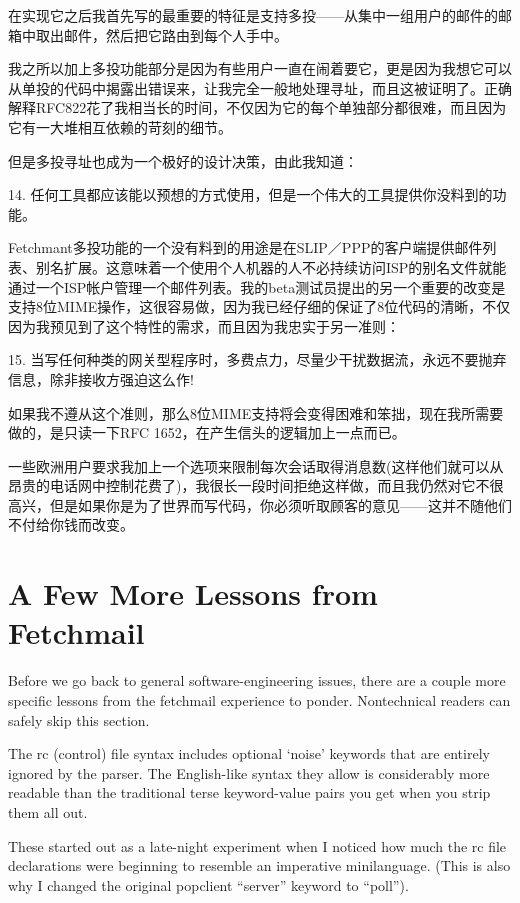\documentclass[a4paper,12pt,UTF8,twoside]{ctexbook}
\begin{document}
在实现它之后我首先写的最重要的特征是支持多投——从集中一组用户的邮件的邮箱中取出邮件，然后把它路由到每个人手中。


我之所以加上多投功能部分是因为有些用户一直在闹着要它，更是因为我想它可以从单投的代码中揭露出错误来，让我完全一般地处理寻址，而且这被证明了。正确解释RFC822花了我相当长的时间，不仅因为它的每个单独部分都很难，而且因为它有一大堆相互依赖的苛刻的细节。


但是多投寻址也成为一个极好的设计决策，由此我知道：


14. 任何工具都应该能以预想的方式使用，但是一个伟大的工具提供你没料到的功能。


Fetchmant多投功能的一个没有料到的用途是在SLIP／PPP的客户端提供邮件列表、别名扩展。这意味着一个使用个人机器的人不必持续访问ISP的别名文件就能通过一个ISP帐户管理一个邮件列表。我的beta测试员提出的另一个重要的改变是支持8位MIME操作，这很容易做，因为我已经仔细的保证了8位代码的清晰，不仅因为我预见到了这个特性的需求，而且因为我忠实于另一准则：


15. 当写任何种类的网关型程序时，多费点力，尽量少干扰数据流，永远不要抛弃信息，除非接收方强迫这么作!


如果我不遵从这个准则，那么8位MIME支持将会变得困难和笨拙，现在我所需要做的，是只读一下RFC 1652，在产生信头的逻辑加上一点而已。


一些欧洲用户要求我加上一个选项来限制每次会话取得消息数(这样他们就可以从昂贵的电话网中控制花费了)，我很长一段时间拒绝这样做，而且我仍然对它不很高兴，但是如果你是为了世界而写代码，你必须听取顾客的意见——这并不随他们不付给你钱而改变。

\chapter{A Few More Lessons from Fetchmail}

Before we go back to general software-engineering issues, there are a couple more specific lessons from the fetchmail experience to ponder. Nontechnical readers can safely skip this section.

The rc (control) file syntax includes optional `noise' keywords that are entirely ignored by the parser. The English-like syntax they allow is considerably more readable than the traditional terse keyword-value pairs you get when you strip them all out.

These started out as a late-night experiment when I noticed how much the rc file declarations were beginning to resemble an imperative minilanguage. (This is also why I changed the original popclient ``server'' keyword to ``poll'').
\end{document}

